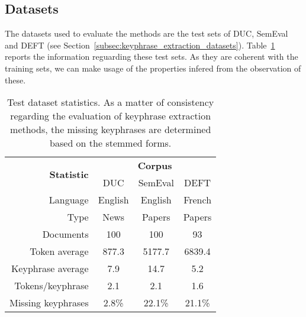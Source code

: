   \subsection{Datasets}
  \label{subsec:datasets}
    The datasets used to evaluate the methods are the test sets of DUC,
    SemEval and DEFT (see Section~\ref{subsec:keyphrase_extraction_datasets}).
    Table~\ref{tab:test_dataset_statistics} reports the information reguarding
    these test sets. As they are coherent with the training sets, we can make
    usage of the properties infered from the observation of these.
    \begin{table}
      \centering
      \begin{tabular}{@{~}r@{~}c@{~}c@{~}c@{~}}
        \toprule
        \multirow{2}{*}[-2pt]{\textbf{Statistic}} & \multicolumn{3}{c}{\textbf{Corpus}}\\
        \cmidrule{2-4}
        & DUC & SemEval & DEFT\\
        \midrule
        Language & English & English & French\\
        Type & News & Papers & Papers\\
        Documents & 100 & 100 & 93\\
        Token average & 877.3 & 5177.7 & 6839.4\\
        Keyphrase average & 7.9 & 14.7 & 5.2\\
        Tokens/keyphrase & 2.1 & 2.1 & 1.6\\
        Missing keyphrases & 2.8\% & 22.1\% & 21.1\% \\
        \bottomrule
      \end{tabular}
      \caption{Test dataset statistics. As a matter of consistency regarding
               the evaluation of keyphrase extraction methods, the missing
               keyphrases are determined based on the stemmed forms.
               \label{tab:test_dataset_statistics}}
    \end{table}

